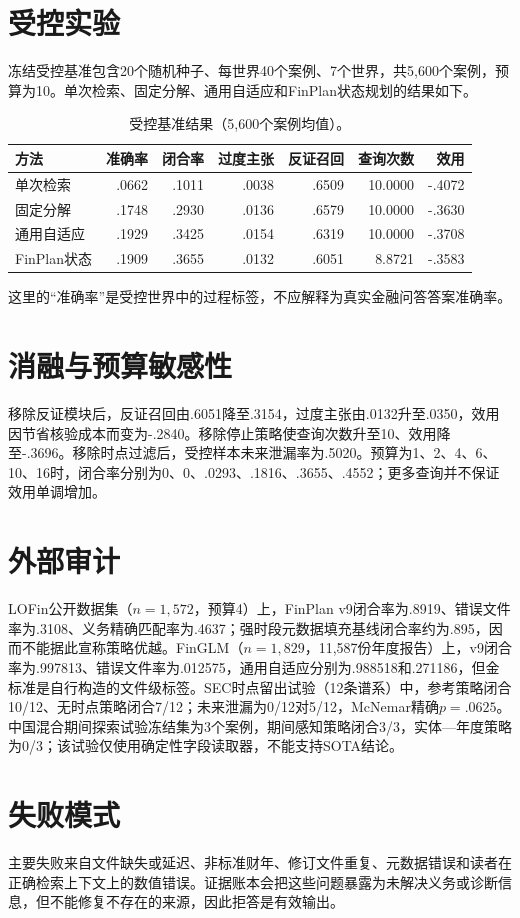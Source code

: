 \documentclass[12pt,openright]{ctexbook}
\begin{document}
\section{受控实验}
冻结受控基准包含20个随机种子、每世界40个案例、7个世界，共5,600个案例，预算为10。单次检索、固定分解、通用自适应和FinPlan状态规划的结果如下。
\begin{table}[htbp]\centering\small
\caption{受控基准结果（5,600个案例均值）。}
\begin{tabular}{lrrrrrr}\toprule
方法&准确率&闭合率&过度主张&反证召回&查询次数&效用\\\midrule
单次检索&.0662&.1011&.0038&.6509&10.0000&-.4072\\
固定分解&.1748&.2930&.0136&.6579&10.0000&-.3630\\
通用自适应&.1929&.3425&.0154&.6319&10.0000&-.3708\\
FinPlan状态&.1909&.3655&.0132&.6051&8.8721&-.3583\\\bottomrule
\end{tabular}
\end{table}
这里的“准确率”是受控世界中的过程标签，不应解释为真实金融问答答案准确率。

\section{消融与预算敏感性}
移除反证模块后，反证召回由.6051降至.3154，过度主张由.0132升至.0350，效用因节省核验成本而变为-.2840。移除停止策略使查询次数升至10、效用降至-.3696。移除时点过滤后，受控样本未来泄漏率为.5020。预算为1、2、4、6、10、16时，闭合率分别为0、0、.0293、.1816、.3655、.4552；更多查询并不保证效用单调增加。

\section{外部审计}
LOFin公开数据集（$n=1,572$，预算4）上，FinPlan v9闭合率为.8919、错误文件率为.3108、义务精确匹配率为.4637；强时段元数据填充基线闭合率约为.895，因而不能据此宣称策略优越。FinGLM（$n=1,829$，11,587份年度报告）上，v9闭合率为.997813、错误文件率为.012575，通用自适应分别为.988518和.271186，但金标准是自行构造的文件级标签。SEC时点留出试验（12条谱系）中，参考策略闭合10/12、无时点策略闭合7/12；未来泄漏为0/12对5/12，McNemar精确$p=.0625$。中国混合期间探索试验冻结集为3个案例，期间感知策略闭合3/3，实体—年度策略为0/3；该试验仅使用确定性字段读取器，不能支持SOTA结论。

\section{失败模式}
主要失败来自文件缺失或延迟、非标准财年、修订文件重复、元数据错误和读者在正确检索上下文上的数值错误。证据账本会把这些问题暴露为未解决义务或诊断信息，但不能修复不存在的来源，因此拒答是有效输出。
\end{document}
